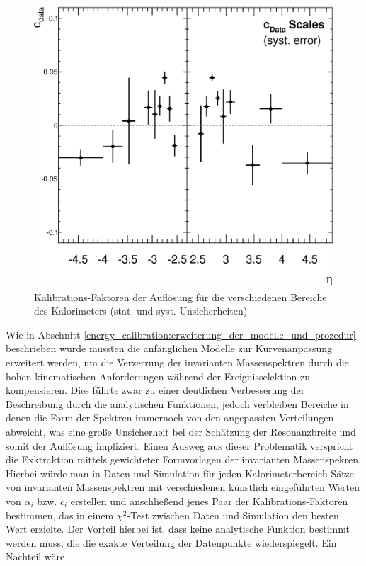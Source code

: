 \begin{figure}
\begin{minipage}{0.48\textwidth}
        \includegraphics[width=1.\textwidth]{plots/cdata_syst}
        \captionsetup{format=plain}
        \caption{Kalibrations-Faktoren der Auflösung für die verschiedenen
            Bereiche des Kalorimeters (stat. und syst. Unsicherheiten)}
        \label{fig:cdata_syst}
    \end{minipage}
\end{figure}

Wie in Abschnitt \ref{energy_calibration:erweiterung_der_modelle_und_prozedur}
beschrieben wurde mussten die anfänglichen Modelle zur Kurvenanpassung
erweitert werden, um die Verzerrung der invarianten Massenspektren durch die
hohen kinematischen Anforderungen während der Ereignisselektion zu
kompensieren.  Dies führte zwar zu einer deutlichen Verbesserung der
Beschreibung durch die analytischen Funktionen, jedoch verbleiben Bereiche in
denen die Form der Spektren immernoch von den angepassten Verteilungen
abweicht, was eine große Unsicherheit bei der Schätzung der Resonanzbreite und
somit der Auflösung impliziert. Einen Ausweg aus dieser Problematik verspricht
die Exktraktion mittels gewichteter Formvorlagen der invarianten Massenspekren.
Hierbei würde man in Daten und Simulation für jeden Kalorimeterbereich Sätze
von invarianten Massenspektren mit verschiedenen künstlich eingeführten Werten
von $\alpha_i$ bzw. $c_i$ erstellen und anschließend jenes Paar der
Kalibrations-Faktoren bestimmen, das in einem $\chi^2$-Test zwischen Daten
und Simulation den besten Wert erzielte. Der Vorteil hierbei ist, dass keine
analytische Funktion bestimmt werden muss, die die exakte Verteilung der
Datenpunkte wiederspiegelt. Ein Nachteil wäre \development


